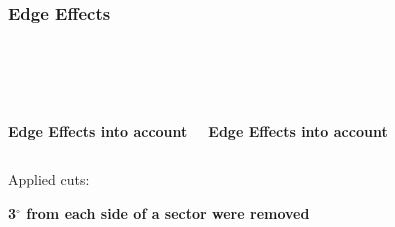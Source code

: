 \documentclass[svgnames] {beamer}
\begin{document}




\begin{frame}

  \frametitle{Edge Effects}
  
  \begin{figure}[H]
    \centering
    \begin{minipage}[h]{0.45\linewidth}
      \\	
    \end{minipage}
    \begin{minipage}[h]{0.45\linewidth}
      \\
    \end{minipage}
    \end{figure}

  \begin{columns}[c]
    \begin{block}{}
      \textbf {Edge Effects {\color{blue}{ARE NOT TAKEN}} into account}
    \end{block}
    
    \begin{block}{}
      \textbf {Edge Effects {\color{red}{ARE TAKEN}} into account}
    \end{block}
  \end{columns}

  \begin{columns}[c]
    \begin{block}{Applied cuts:}
      \begin{center}
        \textbf {3$^{\circ}$ from each side of a sector were removed}
      \end{center}
    \end{block}
  \end{columns}
  
\end{frame}

\end{document}
